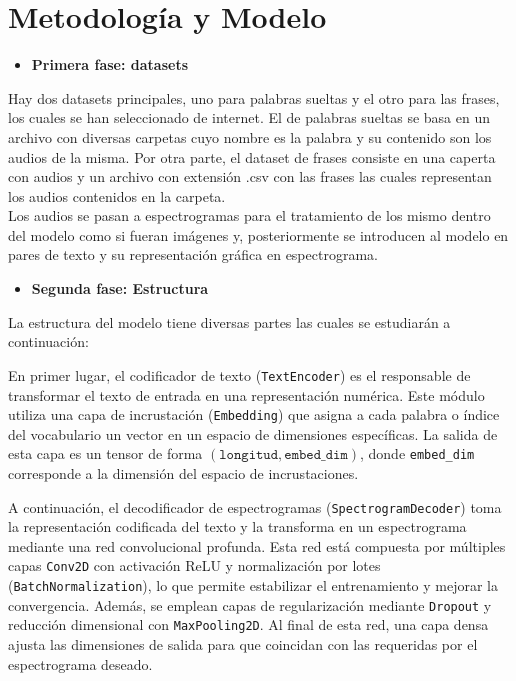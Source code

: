 \documentclass{article}
\begin{document}
\section{\Huge Metodología y Modelo}
\begin{Large}
\begin{itemize}
    \item \textbf{Primera fase: datasets}     
\end{itemize}
Hay dos datasets principales, uno para palabras sueltas y el otro para las frases, los cuales se han seleccionado de internet. El de palabras sueltas se basa en un archivo con diversas carpetas cuyo nombre es la palabra y su contenido son los audios de la misma. Por otra parte, el dataset de frases consiste en una caperta con audios y un archivo con extensión .csv con las frases las cuales representan los audios contenidos en la carpeta.\\

Los audios se pasan a espectrogramas para el tratamiento de los mismo dentro del modelo como si fueran imágenes y, posteriormente se introducen al modelo en pares de texto y su representación gráfica en espectrograma.

\vspace{1cm}
\begin{itemize}
    \item \textbf{Segunda fase: Estructura}     
\end{itemize}
La estructura del modelo tiene diversas partes las cuales se estudiarán a continuación:

En primer lugar, el codificador de texto (\texttt{TextEncoder}) es el responsable de transformar el texto de entrada en una representación numérica. Este módulo utiliza una capa de incrustación (\texttt{Embedding}) que asigna a cada palabra o índice del vocabulario un vector en un espacio de dimensiones específicas. La salida de esta capa es un tensor de forma \((\texttt{longitud}, \texttt{embed\_dim})\), donde \texttt{embed\_dim} corresponde a la dimensión del espacio de incrustaciones.

A continuación, el decodificador de espectrogramas (\texttt{SpectrogramDecoder}) toma la representación codificada del texto y la transforma en un espectrograma mediante una red convolucional profunda. Esta red está compuesta por múltiples capas \texttt{Conv2D} con activación ReLU y normalización por lotes (\texttt{BatchNormalization}), lo que permite estabilizar el entrenamiento y mejorar la convergencia. Además, se emplean capas de regularización mediante \texttt{Dropout} y reducción dimensional con \texttt{MaxPooling2D}. Al final de esta red, una capa densa ajusta las dimensiones de salida para que coincidan con las requeridas por el espectrograma deseado.


\end{Large}
\end{document}
